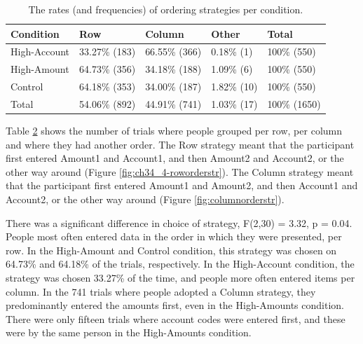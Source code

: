 \begin{table}
\begin{itemize}
\begin{table}[!ht]
\centering
\begin{tabular}{|l|l|l|l|l|}
\cline{1-5}
Condition    & Row           & Column      & Other       & Total      \\ \hline
High-Account & 33.27\% {\footnotesize (183)} & 66.55\% {\footnotesize (366)} & 0.18\% {\footnotesize(1)}  & 100\% {\footnotesize (550)}  \\ \hline
High-Amount  & 64.73\% {\footnotesize (356)} & 34.18\% {\footnotesize (188)} & 1.09\% {\footnotesize(6)}  & 100\% {\footnotesize (550)}  \\ \hline
Control      & 64.18\% {\footnotesize (353)} & 34.00\% {\footnotesize (187)} & 1.82\% {\footnotesize(10)}  & 100\% {\footnotesize (550)}  \\ \hline
Total        & 54.06\% {\footnotesize (892)} & 44.91\% {\footnotesize (741)} & 1.03\% {\footnotesize(17)} & 100\% {\footnotesize (1650)} \\ \hline
\end{tabular}
\caption{The rates (and frequencies) of ordering strategies per condition.}\label{table:ch34_4-str-order}
\end{table}

Table \ref{table:ch34_4-str-order} shows the number of trials where people grouped per row, per column and where they had another order. The Row strategy meant that the participant first entered Amount1 and Account1, and then Amount2 and Account2, or the other way around (Figure \ref{fig:ch34_4-roworderstr}). The Column strategy meant that the participant first entered Amount1 and Amount2, and then Account1 and Account2, or the other way around (Figure \ref{fig:columnorderstr}). 

There was a significant difference in choice of strategy, F(2,30) = 3.32, p = 0.04. People most often entered data in the order in which they were presented, per row. In the High-Amount and Control condition, this strategy was chosen on 64.73\% and 64.18\% of the trials, respectively. In the High-Account condition, the strategy was chosen 33.27\% of the time, and people more often entered items per column. In the 741 trials where people adopted a Column strategy, they predominantly entered the amounts first, even in the High-Amounts condition. There were only fifteen trials where account codes were entered first, and these were by the same person in the High-Amounts condition.


\end{itemize}
\end{table}
